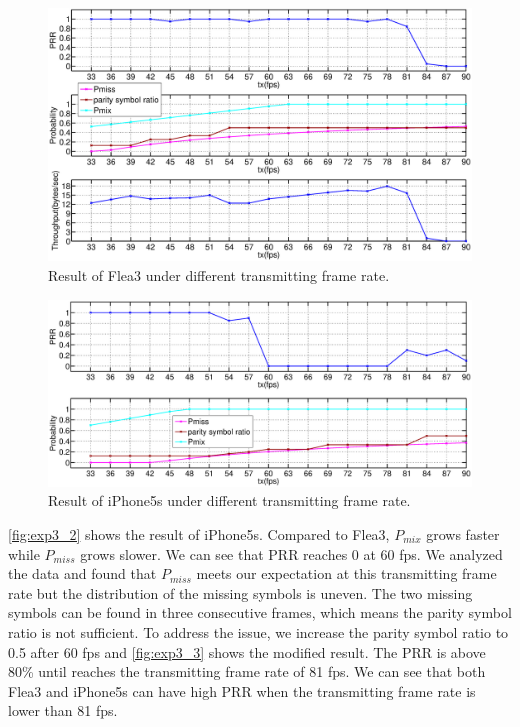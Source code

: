 \begin{figure}[!htb]
  \hspace{-2em}
  \includegraphics[scale=0.215]{fig/exp3_flea_new.eps}
  \caption{Result of Flea3 under different transmitting frame rate.}
  \label{fig:exp3_1}
\end{figure}

\begin{figure}[!htb]
  \hspace{-2em}
  \includegraphics[scale=0.2]{fig/exp3_iphone5s_new.eps}
  \caption{Result of iPhone5s under different transmitting frame rate.}
  \label{fig:exp3_2}
\end{figure}

\autoref{fig:exp3_2} shows the result of iPhone5s. Compared to Flea3, $P_{mix}$ grows faster while $P_{miss}$ grows slower. We can see that PRR reaches 0 at 60 fps. We analyzed the data and found that $P_{miss}$ meets our expectation at this transmitting frame rate but the distribution of the missing symbols is uneven. The two missing symbols can be found in three consecutive frames, which means the parity symbol ratio is not sufficient. To address the issue, we increase the parity symbol ratio to 0.5 after 60 fps and \autoref{fig:exp3_3} shows the modified result. The PRR is above 80\% until reaches the transmitting frame rate of 81 fps. We can see that both Flea3 and iPhone5s can have high PRR when the transmitting frame rate is lower than 81 fps.

